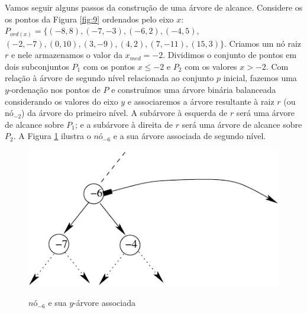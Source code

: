 Vamos seguir alguns passos da construção de uma árvore de alcance. Considere os os pontos da Figura \ref{fig:9} ordenados pelo eixo $x$: $P_{ord(x)} = \{(-8,8), (-7, -3), (-6, 2), (-4,5),$ $(-2,-7),(0,10), (3,-9), (4,2), (7,-11), (15,3)\}$. Criamos um nó raiz $r$ e nele armazenamos o valor da $x_{med} = -2$. Dividimos o conjunto de pontos em dois subconjuntos $P_1$ com os pontos $x\leq -2$ e $P_2$ com os valores $x > -2$.
Com relação à árvore de segundo nível relacionada ao conjunto $p$ inicial, fazemos uma $y$-ordenação nos pontos de $P$ e construímos uma árvore binária balanceada considerando os valores do eixo $y$ e associaremos a árvore resultante à raiz $r$ (ou nó$_{-2}$) da árvore do primeiro nível. A subárvore à esquerda de $r$ será uma árvore de alcance sobre $P_1$; e a subárvore à direita de $r$ será uma árvore de alcance sobre $P_2$.
A Figura \ref{fig:10} ilustra o $nó_{-6}$ e a sua árvore associada de segundo nível.
\begin{figure}[h!]

\centering
\begin{minipage}{.5\textwidth}
  \centering
  \includegraphics[width=.8\linewidth]{images/range_tree3.pdf}

  \label{fig:test1}
\end{minipage}%
\begin{minipage}{.5\textwidth}
  \centering
  
  \label{fig:test2}
 
\end{minipage}
 \caption{$nó_{-6}$ e sua $y$-árvore associada}
 \label{fig:10}
\end{figure}

